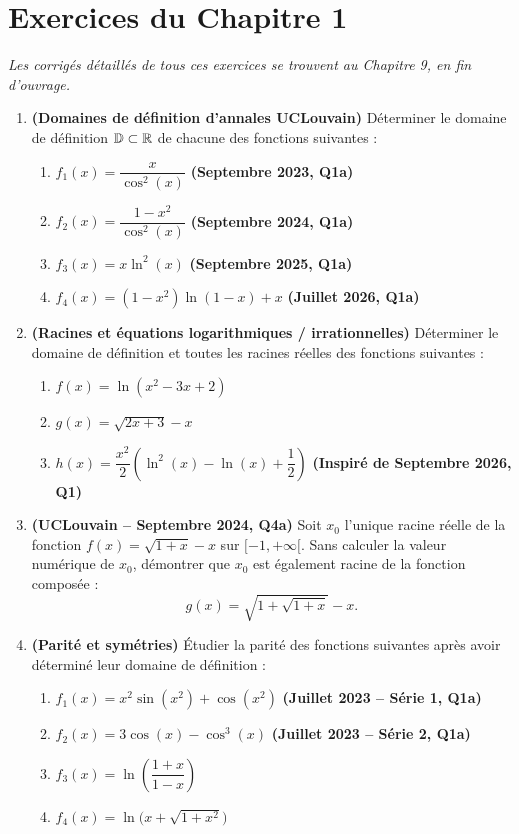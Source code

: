 \section{Exercices du Chapitre 1}

\emph{Les corrigés détaillés de tous ces exercices se trouvent au Chapitre 9, en fin d'ouvrage.}

\begin{enumerate}[label=\textbf{Exercice 1.\arabic* --}]
    \item \textbf{(Domaines de définition d'annales UCLouvain)} Déterminer le domaine de définition $\mathbb{D} \subset \mathbb{R}$ de chacune des fonctions suivantes :
    \begin{enumerate}
        \item $f_1(x) = \dfrac{x}{\cos^2(x)}$ \quad \textbf{(Septembre 2023, Q1a)}
        \item $f_2(x) = \dfrac{1 - x^2}{\cos^2(x)}$ \quad \textbf{(Septembre 2024, Q1a)}
        \item $f_3(x) = x\ln^2(x)$ \quad \textbf{(Septembre 2025, Q1a)}
        \item $f_4(x) = (1 - x^2)\ln(1 - x) + x$ \quad \textbf{(Juillet 2026, Q1a)}
    \end{enumerate}

    \item \textbf{(Racines et équations logarithmiques / irrationnelles)} Déterminer le domaine de définition et toutes les racines réelles des fonctions suivantes :
    \begin{enumerate}
        \item $f(x) = \ln(x^2 - 3x + 2)$
        \item $g(x) = \sqrt{2x + 3} - x$
        \item $h(x) = \dfrac{x^2}{2}\left(\ln^2(x) - \ln(x) + \dfrac{1}{2}\right)$ \quad \textbf{(Inspiré de Septembre 2026, Q1)}
    \end{enumerate}

    \item \textbf{(UCLouvain -- Septembre 2024, Q4a)} Soit $x_0$ l'unique racine réelle de la fonction $f(x) = \sqrt{1+x} - x$ sur $[-1, +\infty[$. Sans calculer la valeur numérique de $x_0$, démontrer que $x_0$ est également racine de la fonction composée :
    \[
        g(x) = \sqrt{1 + \sqrt{1+x}} - x.
    \]

    \item \textbf{(Parité et symétries)} Étudier la parité des fonctions suivantes après avoir déterminé leur domaine de définition :
    \begin{enumerate}
        \item $f_1(x) = x^2\sin(x^2) + \cos(x^2)$ \quad \textbf{(Juillet 2023 -- Série 1, Q1a)}
        \item $f_2(x) = 3\cos(x) - \cos^3(x)$ \quad \textbf{(Juillet 2023 -- Série 2, Q1a)}
        \item $f_3(x) = \ln\left(\dfrac{1+x}{1-x}\right)$
        \item $f_4(x) = \ln\bigl(x + \sqrt{1+x^2}\bigr)$
    \end{enumerate}


\end{enumerate}
